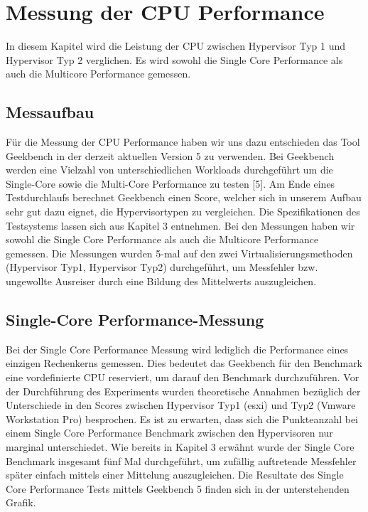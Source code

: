 \documentclass[conference]{IEEEtran}
\begin{document}
\section{Messung der CPU Performance}
\label{Messung der CPU Performance}
In diesem Kapitel wird die Leistung der CPU zwischen Hypervisor Typ 1 und Hypervisor Typ 2 verglichen. Es wird sowohl die Single Core Performance als auch die Multicore Performance gemessen.

\subsection{Messaufbau}
Für die Messung der CPU Performance haben wir uns dazu entschieden das Tool Geekbench in der derzeit aktuellen Version 5 zu verwenden. Bei Geekbench werden eine Vielzahl von unterschiedlichen Workloads durchgeführt um die Single-Core sowie die Multi-Core Performance zu testen [5]. Am Ende eines Testdurchlaufs berechnet Geekbench einen Score, welcher sich in unserem Aufbau sehr gut dazu eignet, die Hypervisortypen zu vergleichen. Die Spezifikationen des Testsystems lassen sich aus Kapitel 3 entnehmen.
Bei den Messungen haben wir sowohl die Single Core Performance als auch die Multicore Performance gemessen.  Die Messungen wurden 5-mal auf den zwei Virtualisierungsmethoden (Hypervisor Typ1, Hypervisor Typ2) durchgeführt, um Messfehler bzw. ungewollte Ausreiser durch eine Bildung des Mittelwerts auszugleichen.


\subsection{Single-Core Performance-Messung}
Bei der Single Core Performance Messung wird lediglich die Performance eines einzigen Rechenkerns gemessen. Dies bedeutet das Geekbench für den Benchmark eine vordefinierte CPU reserviert, um darauf den Benchmark durchzuführen. Vor der Durchführung des Experiments wurden theoretische Annahmen bezüglich der Unterschiede in den Scores zwischen Hypervisor Typ1 (esxi) und Typ2 (Vmware Workstation Pro) besprochen. Es ist zu erwarten, dass sich die Punkteanzahl bei einem Single Core Performance Benchmark zwischen den Hypervisoren nur marginal unterschiedet.
Wie bereits in Kapitel 3 erwähnt wurde der Single Core Benchmark insgesamt fünf Mal durchgeführt, um zufällig auftretende Messfehler später einfach mittels einer Mittelung auszugleichen. Die Resultate des Single Core Performance Tests mittels Geekbench 5 finden sich in der unterstehenden Grafik. \newline 
\end{document}

